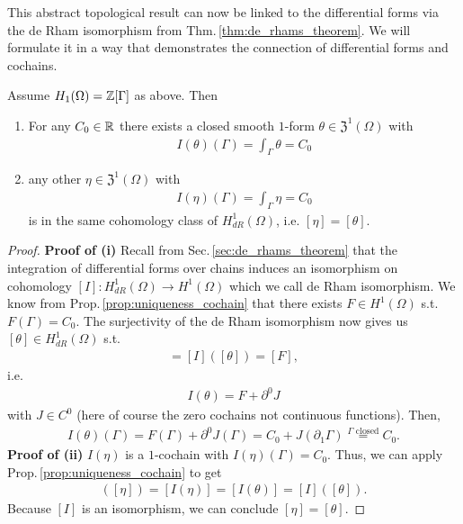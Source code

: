 \documentclass[../master_thesis.tex]{subfiles}
\begin{document}
This abstract topological result can now be linked to the differential 
forms via the de Rham isomorphism from Thm.\,\ref{thm:de_rhams_theorem}. 
We will formulate it in a way 
that demonstrates the connection of differential forms and cochains.
\begin{corollary}\label{cor:existence_uniqueness_1form}
    Assume $H_1(\Omega) = \mathbb{Z} [\Gamma]$ as above. Then
    \begin{enumerate}[\normalfont(i)]
        \item For any $C_0 \in \mathbb{R}$ there exists a closed smooth $1$-form 
            $\theta \in \mathfrak{Z}^1(\Omega)$ with 
            \begin{align*}
                I(\theta)(\Gamma) = \int_\Gamma \theta = C_0
            \end{align*}
        \item any other $\eta \in \mathfrak{Z}^1(\Omega)$ with 
            \begin{align*}
                I(\eta)(\Gamma) = \int_\Gamma \eta = C_0
            \end{align*}
            is in the same cohomology class of $H_{dR}^1(\Omega)$,
            i.e. $[\eta] = [\theta]$.
    \end{enumerate}
\end{corollary}

\begin{proof}
    \textbf{Proof of (i)}
    Recall from Sec.\,\ref{sec:de_rhams_theorem} 
    that the integration of differential forms 
    over chains induces an isomorphism on cohomology 
    $[I]: H_{dR}^1(\Omega) \rightarrow H^1(\Omega)$ which we call 
    de Rham isomorphism. We know from 
    Prop.\,\ref{prop:uniqueness_cochain} that there exists $F\in H^1(\Omega)$ 
    s.t. $F(\Gamma) = C_0$. The surjectivity of the de Rham isomorphism 
    now gives us $[\theta] \in H_{dR}^1(\Omega)$ s.t.
    \begin{align*}
        [I(\theta)] = [I]([\theta]) = [F],
    \end{align*}
    i.e.
    \begin{align*}
        I(\theta) = F + \partial^0 J
    \end{align*}
    with $J \in C^0$ (here of course the zero cochains not continuous functions). 
    Then, 
    \begin{align*}
        I(\theta)(\Gamma) = F(\Gamma) + \partial^0 J(\Gamma) 
        = C_0 + J(\partial_1 \Gamma) 
        \stackrel{\text{$\Gamma$ closed}}{=} C_0. 
    \end{align*}
    \textbf{Proof of (ii)}
    $I(\eta)$ is a $1$-cochain with $I(\eta)(\Gamma) = C_0$.
    Thus, we can apply Prop.\,\ref{prop:uniqueness_cochain} to get
    \begin{align*}
        [I]([\eta])=[I(\eta)] = [I(\theta)]=[I]([\theta]).
    \end{align*}
    Because $[I]$ is an isomorphism, we can conclude $[\eta] = [\theta]$.
\end{proof}
\end{document}
